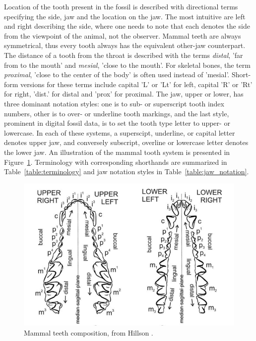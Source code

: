 \documentclass{article}
\begin{document}
Location of the tooth present in the fossil is described with directional terms specifying the side, jaw and the location on the jaw.
The most
intuitive are left and right describing the side, where one needs to note that each denotes the side from the viewpoint of the 
animal, not the observer. Mammal teeth are always symmetrical, thus every tooth always has the 
equivalent other-jaw counterpart. The distance of a tooth from the throat 
is described with the terms \textit{distal}, 'far from to the mouth' and \textit{mesial}, 'close to the mouth'. For skeletal bones, the term \textit{proximal}, 
'close to the center of the body' is often used instead of 'mesial'.
Short-form versions for these terms include capital 'L' or 'Lt' for left, capital 'R' or 'Rt' for right, 'dist.' 
for distal and 'prox' for proximal.
The jaw, upper or lower, has three dominant notation styles: one is to sub- or superscript tooth index numbers, other is to 
over- or underline tooth markings, and the last style, prominent in digital fossil data, is to set the tooth type letter to upper- or lowercase.
In each of these systems, a superscipt, underline, or capital letter denotes upper jaw, and conversely subscript, overline or lowercase letter denotes the lower jaw.
An illustration of the mammal tooth system is presented in Figure~\ref{image:mammal_teeth}. Terminology with corresponding shorthands are summarized in Table~\ref{table:terminology} and jaw notation styles in Table~\ref{table:jaw_notation}.

\begin{figure}[h]
    \centering
    \includegraphics*[scale=0.43]{../images/teeth_img_hillson_book.png}
    \caption{Mammal teeth composition, from Hillson \cite{Hillson_2005}.}
    \label{image:mammal_teeth}
\end{figure}
\end{document}
